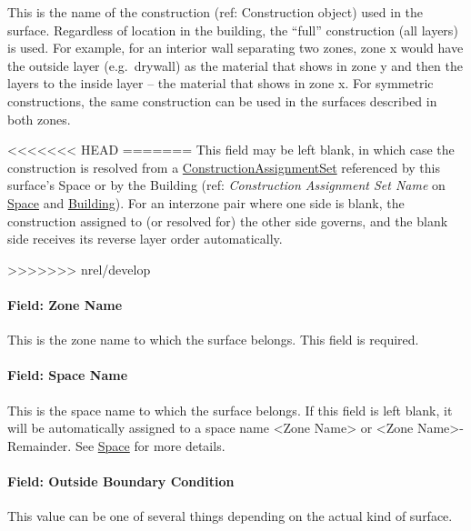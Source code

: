 This is the name of the construction (ref: Construction object) used in the surface. Regardless of location in the building, the ``full'' construction (all layers) is used. For example, for an interior wall separating two zones, zone x would have the outside layer (e.g.~drywall) as the material that shows in zone y and then the layers to the inside layer -- the material that shows in zone x. For symmetric constructions, the same construction can be used in the surfaces described in both zones.

<<<<<<< HEAD
=======
This field may be left blank, in which case the construction is resolved from a \hyperref[constructionassignmentset]{ConstructionAssignmentSet} referenced by this surface's Space or by the Building (ref: \emph{Construction Assignment Set Name} on \hyperref[space]{Space} and \hyperref[building]{Building}). For an interzone pair where one side is blank, the construction assigned to (or resolved for) the other side governs, and the blank side receives its reverse layer order automatically.

>>>>>>> nrel/develop
\paragraph{Field: Zone Name}\label{field-zone-name-13}

This is the zone name to which the surface belongs. This field is required.

\paragraph{Field: Space Name}\label{field-space-name-13}

This is the space name to which the surface belongs. If this field is left blank, it will be automatically assigned to a space name <Zone Name> or <Zone Name>-Remainder. See \hyperref[space]{Space} for more details.

\paragraph{Field: Outside Boundary Condition}\label{field-outside-boundary-condition-3}

This value can be one of several things depending on the actual kind of surface.

